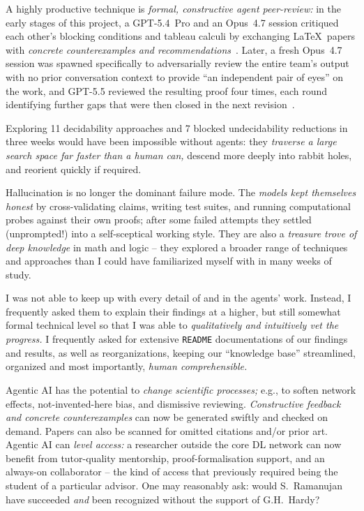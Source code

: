 \documentclass[
]{ceurart}
\theoremstyle{definition}
\begin{document}
A highly productive technique is \emph{formal, constructive agent
peer-review:} in the early stages of this project, a GPT-5.4~Pro and
an Opus~4.7 session critiqued each other's blocking conditions and
tableau calculi by exchanging \LaTeX\ papers with \emph{concrete
counterexamples and
recommendations}~\cite{FWProof,TriangleBlocking,PatchworkAugmentation,
  TypedPatchworkCounterexample,ResponseGPTBlocking,StatusAfterFW}.
Later, a fresh Opus~4.7 session was spawned specifically to
adversarially review the entire team's output with no prior
conversation context to provide ``an independent pair of eyes'' on the
work, and GPT-5.5 reviewed the resulting proof four times, each round
identifying further gaps that were then closed in the next
revision~\cite{GPT55Repaired}.

Exploring 11 decidability approaches and 7 blocked undecidability
reductions in three weeks would have been impossible without agents:
they \emph{traverse a large search space far faster than a human can,}
descend more deeply into rabbit holes, and reorient quickly if
required.

Hallucination is no longer the dominant failure mode. The \emph{models
kept themselves honest} by cross-validating claims, writing test
suites, and running computational probes against their own proofs;
after some failed attempts they settled (unprompted!) into a
self-sceptical working style.  They are also a \emph{treasure trove of
deep knowledge} in math and logic -- they explored a broader range of
techniques and approaches than I could have familiarized myself with
in many weeks of study.

I was not able to keep up with every detail of and in the agents'
work. Instead, I frequently asked them to explain their findings at a
higher, but still somewhat formal technical level so that I was able
to \emph{qualitatively and intuitively vet the progress.} I frequently
asked for extensive {\tt README} documentations of our findings and
results, as well as reorganizations, keeping our ``knowledge base''
streamlined, organized and most importantly, \emph{human
comprehensible.}

Agentic AI has the potential to \emph{change scientific processes;}
e.g., to soften network effects, not-invented-here bias, and
dismissive reviewing. \emph{Constructive feedback and concrete
counterexamples} can now be generated swiftly and checked on
demand. Papers can also be scanned for omitted citations and/or prior
art. Agentic AI can \emph{level access:} a researcher outside the core DL
network can now benefit from tutor-quality mentorship,
proof-formalisation support, and an always-on collaborator -- the kind
of access that previously required being the student of a particular
advisor. One may reasonably ask: would S.~Ramanujan have succeeded
\emph{and} been recognized without the support of G.H.~Hardy?
\end{document}
